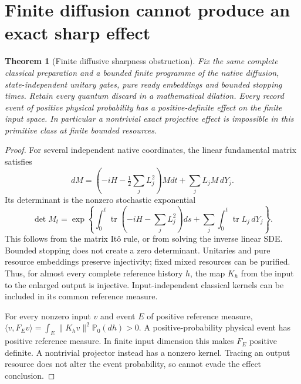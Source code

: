 \documentclass[11pt,oneside,openany]{book}
\newtheorem{theorem}{Theorem}[chapter]
\theoremstyle{definition}
\theoremstyle{remark}\newtheorem{remark}[theorem]{Remark}
\begin{document}
\section{Finite diffusion cannot produce an exact sharp effect}

\begin{theorem}[Finite diffusive sharpness obstruction]
\label{det:nonsharp}
Fix the same complete classical preparation and a bounded finite
programme of the native diffusion, state-independent unitary gates,
pure ready embeddings and bounded stopping times. Retain every quantum
discard in a mathematical dilation. Every record event of positive
physical probability has a positive-definite effect on the finite
input space. In particular a nontrivial exact projective effect is
impossible in this primitive class at finite bounded resources.
\end{theorem}
\begin{proof}
For several independent native coordinates, the linear fundamental
matrix satisfies
\[
 dM=(-iH-\tfrac12\sum_jL_j^2)Mdt+\sum_jL_jM\,dY_j.
\]
Its determinant is the nonzero stochastic exponential
\[
 \det M_t=\exp\left\{\int_0^t
     \operatorname{tr}(-iH-\sum_jL_j^2)ds
       +\sum_j\int_0^t\operatorname{tr}L_j\,dY_j\right\}.
\]
This follows from the matrix It\^o rule, or from solving the inverse
linear SDE. Bounded stopping does not create a zero determinant.
Unitaries and pure resource embeddings preserve injectivity; fixed
mixed resources can be purified. Thus, for almost every complete
reference history $h$, the map $K_h$ from the input to the enlarged
output is injective. Input-independent classical kernels can be
included in its common reference measure.

For every nonzero input $v$ and event $E$ of positive reference measure,
$\langle v,F_Ev\rangle=\int_E\|K_hv\|^2\mathbb P_0(dh)>0$.
A positive-probability physical event has positive reference measure.
In finite input dimension this makes $F_E$ positive definite. A
nontrivial projector instead has a nonzero kernel. Tracing an output
resource does not alter the event probability, so cannot evade the
effect conclusion.
\end{proof}
\end{document}

